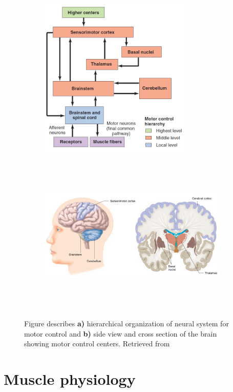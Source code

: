 \begin{figure}[t!]
    \centering
    \begin{subfigure}[t]{0.95\textwidth}
        \centering
        \includegraphics[height=3in]{Images/introduction/control.png}
        \caption{}
    \end{subfigure}%
    
    \begin{subfigure}[t]{0.95\textwidth}
        \centering
        \includegraphics[height=3in]{Images/introduction/control2.png}
        \caption{}
    \end{subfigure}
    \caption{Figure describes \textbf{a)} hierarchical organization of neural system for motor control and \textbf{b)} side view and cross section of the brain showing motor control centers. Retrieved from \citep{Widmaier2014}}
\label{fig:brain_centers}
\end{figure}

\section{Muscle physiology}

